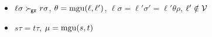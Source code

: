 
\begin{itemize}

    \item
        \( \ell\sigma\mathrel\succ_{\!\mathtt{gr}} r\sigma \),
        \( \theta=\operatorname{mgu}(\ell,\ell') \),
        \( \ell\sigma = \ell'\sigma' = \ell'\theta\rho \),
        \( \ell'\notin\mathcal{V} \)

    \item
        \( s\tau = t\tau \),
        \( \mu=\operatorname{mgu}(s,t) \)
\end{itemize}
